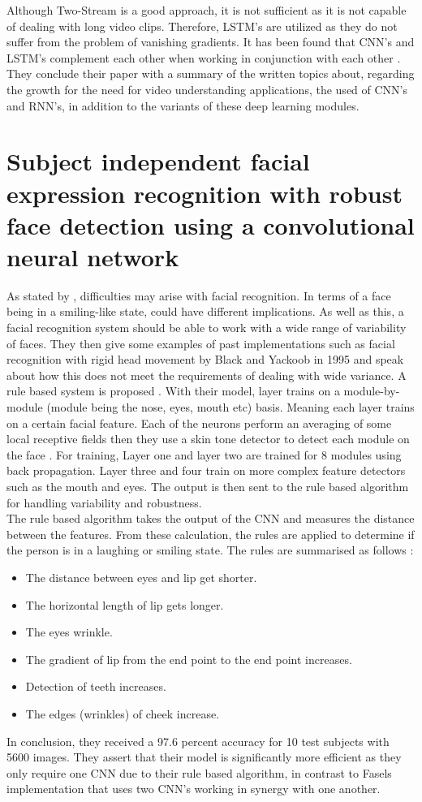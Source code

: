 Although Two-Stream is a good approach, it is not sufficient as it is not capable of dealing with long video clips. Therefore, LSTM's are utilized as they do not suffer from the problem of vanishing gradients. It has been found that CNN's and LSTM's complement each other when working in conjunction with each other \citep{Wu}. They conclude their paper with a summary of the written topics about, regarding the growth for the need for video understanding applications, the used of CNN's and RNN's, in addition to the variants of these deep learning modules. 

\section{Subject independent facial expression recognition with robust face detection using a convolutional neural network}
As stated by \citeauthor{MATSUGU}, difficulties may arise with facial recognition. In terms of a face being in a smiling-like state, could have different implications. As well as this, a facial recognition system should be able to work with a wide range of variability of faces. They then give some examples of past implementations such as facial recognition with rigid head movement by Black and Yackoob in 1995 and speak about how this does not meet the requirements of dealing with wide variance. A rule based system is proposed \citep{MATSUGU}. With their model, layer trains on a module-by-module (module being the nose, eyes, mouth etc) basis. Meaning each layer trains on a certain facial feature. Each of the neurons perform an averaging of some local receptive fields then they use a skin tone detector to detect each module on the face \citep{MATSUGU}. For training, Layer one and layer two are trained for 8 modules using back propagation. Layer three and four train on more complex feature detectors such as the mouth and eyes. The output is then sent to the rule based algorithm for handling variability and robustness. \\
The rule based algorithm takes the output of the CNN and measures the distance between the features. From these calculation, the rules are applied to determine if the person is in a laughing or smiling state. The rules are summarised as follows \citep{MATSUGU}:
\begin{itemize}
	\item The distance between eyes and lip get shorter.
	\item The horizontal length of lip gets longer.
	\item The eyes wrinkle.
	\item The gradient of lip from the end point to the end point increases.
	\item Detection of teeth increases.
	\item The edges (wrinkles) of cheek increase.
\end{itemize}
In conclusion, they received a 97.6 percent accuracy for 10 test subjects with 5600 images. They assert that their model is significantly more efficient as they only require one CNN due to their rule based algorithm, in contrast to Fasels implementation that uses two CNN's working in synergy with one another.

